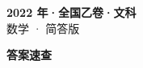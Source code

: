 \documentclass[zihao=-4, a4paper]{ctexart}
\begin{document}
\begin{center}
  {\Large\bfseries 2022 年·全国乙卷·文科}\\[4pt]
  {\large 数学 · 简答版}
\end{center}
\medskip
{}

\clearpage
{}
\begin{center}{\Large\bfseries 答案速查}\end{center}
\medskip

\end{document}
